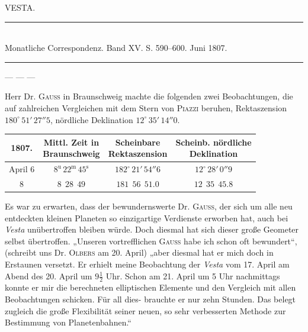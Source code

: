 \clearpage{}
\begin{center}
VESTA.
\end{center}

\begin{center}
\rule{0.6\linewidth}{0.4pt}\\
Monatliche Correspondenz. Band XV. S. 590–600. Juni 1807.\\
\rule{0.6\linewidth}{0.4pt}
\end{center}

--- --- ---

\par\indent Herr Dr. \textsc{Gauss} in Braunschweig machte die folgenden zwei Beobachtungen, die auf zahlreichen Vergleichen mit dem Stern von \textsc{Piazzi} beruhen, Rektaszension $180^\circ\,51'\,27''5$, nördliche Deklination $12^\circ\,35'\,14''0$.

\begin{center}\begingroup
\fontsize{10}{12}\selectfont
\setlength{\tabcolsep}{2.5pt}\renewcommand{\arraystretch}{1.15}
\begin{tabular}{c|c|c|c}
1807. & \shortstack{Mittl. Zeit in\\Braunschweig} & \shortstack{Scheinbare\\Rektaszension \VestaRATwoNinety{}} & \shortstack{Scheinb. nördliche\\Deklination \VestaDecTwoNinety{}} \\ \hline
April 6 & $8^{\text{u}}\,22^{\text{m}}\,45^{\text{s}}$ & $182^\circ\,21'\,54''6$ & $12^\circ\,28'\,0''9$ \\
8 & $8\ \ 28\ \ 49$ & $181\ \ 56\ \ 51.0$ & $12\ \ 35\ \ 45.8$
\end{tabular}\endgroup\end{center}

\par\indent Es war zu erwarten, dass der bewundernswerte Dr. \textsc{Gauss}, der sich um alle neu entdeckten kleinen Planeten so einzigartige Verdienste erworben hat, auch bei \emph{Vesta} unübertroffen bleiben würde. Doch diesmal hat sich dieser große Geometer selbst übertroffen. „Unseren vortrefflichen \textsc{Gauss} habe ich schon oft bewundert“, (schreibt uns Dr. \textsc{Olbers} am 20. April) „aber diesmal hat er mich doch in Erstaunen versetzt. Er erhielt meine Beobachtung der \emph{Vesta} vom 17. April am Abend des 20. April um $9\tfrac{1}{2}$ Uhr. Schon am 21. April um 5 Uhr nachmittags konnte er mir die berechneten elliptischen Elemente und den Vergleich mit allen Beobachtungen schicken. Für all dies-
%
brauchte er nur zehn Stunden. Das belegt zugleich die große Flexibilität seiner neuen, so sehr verbesserten Methode zur Bestimmung von Planetenbahnen.“

